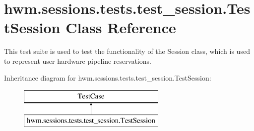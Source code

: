 \hypertarget{classhwm_1_1sessions_1_1tests_1_1test__session_1_1_test_session}{\section{hwm.\-sessions.\-tests.\-test\-\_\-session.\-Test\-Session Class Reference}
\label{classhwm_1_1sessions_1_1tests_1_1test__session_1_1_test_session}
}


This test suite is used to test the functionality of the Session class, which is used to represent user hardware pipeline reservations.  


Inheritance diagram for hwm.\-sessions.\-tests.\-test\-\_\-session.\-Test\-Session\-:\begin{figure}[H]
\begin{center}
\leavevmode
\includegraphics[height=2.000000cm]{classhwm_1_1sessions_1_1tests_1_1test__session_1_1_test_session}
\end{center}
\end{figure}
